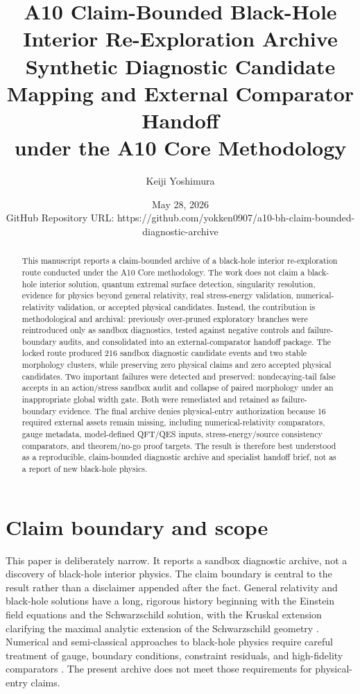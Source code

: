 \documentclass[11pt,a4paper]{article}
\title{\Large A10 Claim-Bounded Black-Hole Interior Re-Exploration Archive\\[0.35em]
\normalsize Synthetic Diagnostic Candidate Mapping and External Comparator Handoff\\
\normalsize under the A10 Core Methodology}
\author{Keiji Yoshimura}
\date{May 28, 2026\\[0.5em]
\small GitHub Repository URL: https://github.com/yokken0907/a10-bh-claim-bounded-diagnostic-archive}
\begin{document}
\maketitle

\begin{abstract}
This manuscript reports a claim-bounded archive of a black-hole interior re-exploration route conducted under the A10 Core methodology. The work does not claim a black-hole interior solution, quantum extremal surface detection, singularity resolution, evidence for physics beyond general relativity, real stress-energy validation, numerical-relativity validation, or accepted physical candidates. Instead, the contribution is methodological and archival: previously over-pruned exploratory branches were reintroduced only as sandbox diagnostics, tested against negative controls and failure-boundary audits, and consolidated into an external-comparator handoff package. The locked route produced 216 sandbox diagnostic candidate events and two stable morphology clusters, while preserving zero physical claims and zero accepted physical candidates. Two important failures were detected and preserved: nondecaying-tail false accepts in an action/stress sandbox audit and collapse of paired morphology under an inappropriate global width gate. Both were remediated and retained as failure-boundary evidence. The final archive denies physical-entry authorization because 16 required external assets remain missing, including numerical-relativity comparators, gauge metadata, model-defined QFT/QES inputs, stress-energy/source consistency comparators, and theorem/no-go proof targets. The result is therefore best understood as a reproducible, claim-bounded diagnostic archive and specialist handoff brief, not as a report of new black-hole physics.
\end{abstract}

\section{Claim boundary and scope}

This paper is deliberately narrow. It reports a sandbox diagnostic archive, not a discovery of black-hole interior physics. The claim boundary is central to the result rather than a disclaimer appended after the fact. General relativity and black-hole solutions have a long, rigorous history beginning with the Einstein field equations and the Schwarzschild solution, with the Kruskal extension clarifying the maximal analytic extension of the Schwarzschild geometry \cite{einstein1915,schwarzschild1916,kruskal1960}. Numerical and semi-classical approaches to black-hole physics require careful treatment of gauge, boundary conditions, constraint residuals, and high-fidelity comparators \cite{gourgoulhon2007,pretorius2005,campanelli2006,baker2006}. The present archive does not meet those requirements for physical-entry claims.
\end{document}
